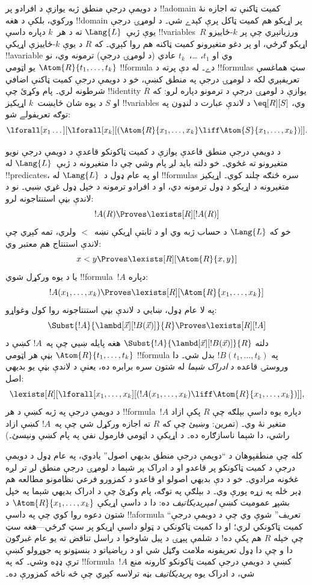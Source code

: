 \documentclass[../../../include/open-logic-section]{subfiles}
\begin{document}


د دويمې درجې منطق ژبه يوازې د افرادو پر !!a{domain} کميت ټاکنې ته
اجازه نۀ ورکوي، بلکې د هغه !!{domain} پر اړيکو هم کميت ټاکل پرې کېدے
شي۔ د لومړۍ درجې يوې ژبې~$\Lang{L}$ ته د هر~$k$ دپاره داسې
!!{variable}s~$R$ ورزياتېږي چې پر $k$-ځاييزو اړيکو ګرځي، او پر دغو
متغيرونو کميت ټاکنه هم روا کېږي۔ که $R$ د يوې $k$-ځاييزې اړيکې
!!a{variable} وي او $t_1$، \dots،~$t_k$ عادي (د لومړۍ درجې) ترمونه
وي، نو $\Atom{R}{t_1,\dots,t_k}$ يو اټومي !!{formula} دے۔ له دې پرته
د !!{formula}s سټ هماغسې تعريفېږي لکه د لومړۍ درجې په منطق کښې، خو د
دويمې درجې کميت ټاکنې اضافي شرطونه لري۔ پام وکړئ چې !!{identity}
يوازې د لومړۍ درجې د ترمونو دپاره لرو: که $R$ او $S$ د يوه شان
ځايښت~$k$ اړيکيز !!{variable}s وي، $\eq[R][S]$ د لاندې عبارت د لنډون
په توګه تعريفولے شو:
\[
\lforall[x_1 \dots][\lforall[x_k][(\Atom{R}{x_1, \dots, x_k} \liff
  \Atom{S}{x_1, \dots, x_k})]].
\]

د دويمې درجې منطق قاعدې يوازې د کميت ټاکونکو قاعدې د دويمې درجې
نويو متغيرونو ته غځوي۔ خو دلته بايد لږ پام وشي چې دا متغيرونه د
ژبې~$\Lang{L}$ له !!{predicate}s، او په عام ډول د~$\Lang{L}$ له
!!{formula}s سره څنګه چلند کوي۔ اړيکيز متغيرونه د اړيکو د ډول
ترمونه دي، او د افرادو ترمونه د خپل ډول غړي ښيي۔ نو د لاندې بڼې
استنتاجونه لرو:
\[
!A(R) \Proves \lexists[R][!A(R)]
\]
خو که $\Lang{L}$ د حساب ژبه وي او د ثابتې اړيکې نښه~$<$ ولري، تمه
کېږي چې لاندې استنتاج هم معتبر وي:
\[
x < y \Proves \lexists[R][\Atom{R}{x,y}]
\]
يا د يوه ورکړل شوي !!{formula}~$!A$ دپاره:
\[
!A(x_1, \dots, x_k) \Proves \lexists[R][\Atom{R}{x_1,\dots,x_k}]
\]
په لا عام ډول، ښايي د لاندې بڼې استنتاجونه روا کول وغواړو:
\[
\Subst{!A}{\lambd[\vec x][!B(\vec x)]}{R} \Proves
\lexists[R][!A]
\]
دلته $\Subst{!A}{\lambd[\vec x][!B(\vec x)]}{R}$ هغه پايله ښيي چې
په~$!A$ کښې د $\Atom{R}{t_1,\dots,t_k}$ بڼې هر اټومي !!{formula} په
$!B(t_1, \dots, t_k)$ بدل شي۔ دا وروستۍ قاعده د {\em ادراک شېما} له
شتون سره برابره ده، يعنې د لاندې بڼې يو بديهي اصل:
\[
\lexists[R][\lforall[x_1, \dots, x_k][(!A(x_1, \dots, x_k) \liff
\Atom{R}{x_1, \dots, x_k})]],
\]
د دويمې درجې په ژبه کښې د هر !!{formula}~$!A$ دپاره يوه داسې بېلګه
چې $R$ پکې ازاد متغير نۀ وي۔ (تمرين: وښيئ چې که $R$ ته اجازه ورکړل
شي چې په~$!A$ کښې ازاد راشي، دا شېما ناسازګاره ده۔ د اړيکې د
اټومي فارمول نفي په پام کښې ونيسئ۔)

کله چې منطقپوهان د ``دويمې درجې منطق بديهي اصول'' يادوي، په عام ډول
د دويمې درجې د کميت ټاکونکو پر قاعدو او د ادراک پر شېما د لومړۍ درجې
منطق لږ تر لږه غځونه مرادوي۔ خو د دې بديهي اصولو او قاعدو د کمزورو
فرعي نظامونو مطالعه هم ډېر ځله په زړه پورې وي۔ د بېلګې په توګه، پام
وکړئ چې د ادراک بديهي شېما په خپل بشپړ عموميت کښې
\emph{امپريديکاتيف} ده: دا د داسې اړيکې
$\Atom{R}{x_1, \dots, x_k}$ د شتون دعوه روا کوي چې په داسې
!!a{formula} ``تعريف'' شوې وي چې د دويمې درجې کميت ټاکونکي لري؛ او دا
کميت ټاکونکي د ټولو داسې اړيکو پر سټ ګرځي---هغه سټ چې خپله $R$ هم پکې
ده!{} د
شلمې پېړۍ د پيل شاوخوا د راسل تناقض ته يو عام غبرګون دا و چې دا ډول
تعريفونه ملامت وګڼل شي او د رياضياتو د بنسټونو په جوړولو کښې ترې ډډه
وشي۔ که په !!{formula}~$!A$ کښې د دويمې درجې کميت ټاکونکو کارونه منع
شي، د ادراک يوه {\em پريديکاتيف} بڼه ترلاسه کېږي چې څه ناڅه کمزورې
ده۔
\end{document}
